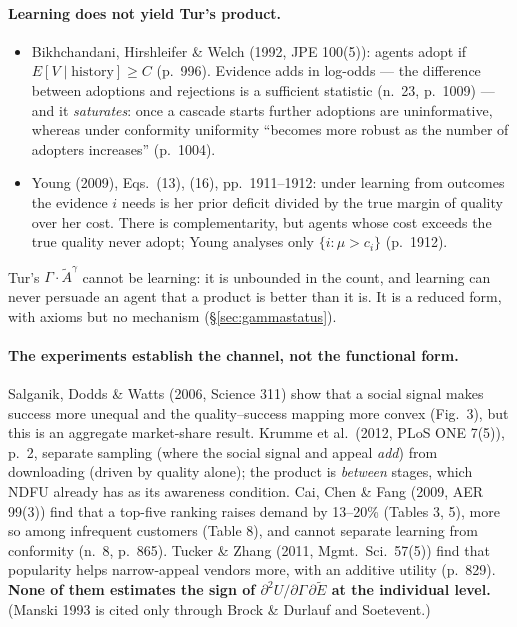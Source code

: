 \documentclass[11pt,a4paper]{article}
\newcommand{\Ee}{\tilde{E}}                 %
\newcommand{\Acount}{\tilde{A}}             %
\begin{document}
\paragraph{Learning does not yield Tur's product.}
\begin{itemize}
  \item Bikhchandani, Hirshleifer \& Welch (1992, JPE 100(5)): agents adopt if
    $E[V\mid\text{history}] \ge C$ (p.~996). Evidence adds in log-odds --- the difference
    between adoptions and rejections is a sufficient statistic (n.~23, p.~1009) --- and it
    \emph{saturates}: once a cascade starts further adoptions are uninformative, whereas
    under conformity uniformity ``becomes more robust as the number of adopters increases''
    (p.~1004).
  \item Young (2009), Eqs.~(13), (16), pp.~1911--1912: under learning from outcomes the
    evidence $i$ needs is her prior deficit divided by the true margin of quality over her
    cost. There is complementarity, but agents whose cost exceeds the true quality never
    adopt; Young analyses only $\{i: \mu > c_i\}$ (p.~1912).
\end{itemize}
Tur's $\Gamma\cdot\Acount^{\gamma}$ cannot be learning: it is unbounded in the count, and
learning can never persuade an agent that a product is better than it is. It is a reduced
form, with axioms but no mechanism (\S\ref{sec:gammastatus}).

\paragraph{The experiments establish the channel, not the functional form.} Salganik,
Dodds \& Watts (2006, Science 311) show that a social signal makes success more unequal and
the quality--success mapping more convex (Fig.~3), but this is an aggregate market-share
result. Krumme et al.\ (2012, PLoS ONE 7(5)), p.~2, separate sampling (where the social
signal and appeal \emph{add}) from downloading (driven by quality alone); the product is
\emph{between} stages, which NDFU already has as its awareness condition. Cai, Chen \& Fang
(2009, AER 99(3)) find that a top-five ranking raises demand by 13--20\% (Tables 3, 5), more
so among infrequent customers (Table 8), and cannot separate learning from conformity
(n.~8, p.~865). Tucker \& Zhang (2011, Mgmt.\ Sci.\ 57(5)) find that popularity helps
narrow-appeal vendors more, with an additive utility (p.~829). \textbf{None of them estimates
the sign of $\partial^2 U / \partial\Gamma\,\partial\Ee$ at the individual level.} (Manski
1993 is cited only through Brock \& Durlauf and Soetevent.)
\end{document}
